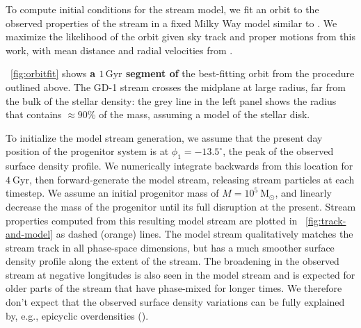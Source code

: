 \documentclass[modern]{aastex62}
\newcommand{\package}[1]{\textsl{#1}}
\newcommand{\msun}{\textrm{M}_\odot}
\newcommand{\kpc}{\textrm{kpc}}
\newcommand{\kms}{\ensuremath{\textrm{km}~\textrm{s}^{-1}}}
\newcommand{\changes}[1]{{\textbf{#1}}}
\begin{document}
To compute initial conditions for the stream model, we fit an orbit to the
observed properties of the stream in a fixed Milky Way model similar to \citet{Bovy:2015}.
We maximize the likelihood of the orbit given sky track and proper motions from
this work, with mean distance and radial velocities from
\cite{Koposov:2010}.

\figurename~\ref{fig:orbitfit} shows \changes{a $1\,\textrm{Gyr}$ segment of} the best-fitting orbit from the procedure outlined above.
The GD-1 stream crosses the midplane at large radius, far from the bulk of the
stellar density:
the grey line in the left panel shows the radius that contains $\approx 90\%$ of
the mass, assuming a \citet{Bovy:2012} model of the stellar disk.

To initialize the model stream generation, we assume that the present day
position of the progenitor system is at $\phi_1 = -13.5^\circ$, the peak of the
observed surface density profile.
We numerically integrate backwards from this location for $4~\textrm{Gyr}$,
then forward-generate the model stream, releasing stream particles at each
timestep.
We assume an initial progenitor mass of $M=10^5~\msun$, and linearly decrease
the mass of the progenitor until its full disruption at the present.
Stream properties computed from this resulting model stream are plotted in
\figurename~\ref{fig:track-and-model} as dashed (orange) lines.
The model stream qualitatively matches the stream track in all phase-space
dimensions, but has a much smoother surface density profile along the extent of
the stream.
The broadening in the observed stream at negative longitudes is also seen in the model stream and is expected for older parts of the stream that have phase-mixed for longer times.
We therefore don't expect that the observed surface density variations can be fully explained
by, e.g., epicyclic overdensities (\citealt{Kupper:2012}).
\end{document}
